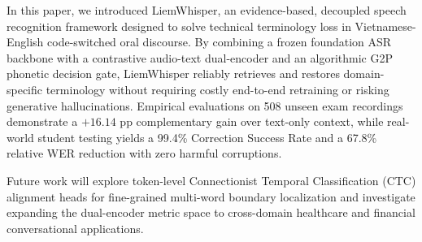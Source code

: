 \documentclass[11pt,conference,onecolumn]{IEEEtran}
\begin{document}
In this paper, we introduced LiemWhisper, an evidence-based, decoupled speech recognition framework designed to solve technical terminology loss in Vietnamese-English code-switched oral discourse. By combining a frozen foundation ASR backbone with a contrastive audio-text dual-encoder and an algorithmic G2P phonetic decision gate, LiemWhisper reliably retrieves and restores domain-specific terminology without requiring costly end-to-end retraining or risking generative hallucinations. Empirical evaluations on 508 unseen exam recordings demonstrate a $+16.14\text{ pp}$ complementary gain over text-only context, while real-world student testing yields a 99.4\% Correction Success Rate and a 67.8\% relative WER reduction with zero harmful corruptions.

Future work will explore token-level Connectionist Temporal Classification (CTC) alignment heads for fine-grained multi-word boundary localization and investigate expanding the dual-encoder metric space to cross-domain healthcare and financial conversational applications.



\end{document}
